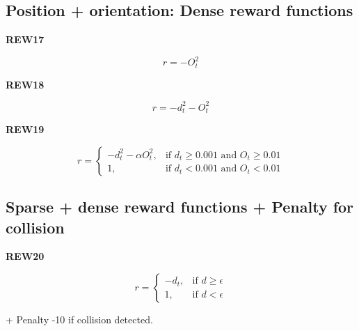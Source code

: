 \documentclass{article}
\newcommand{\norm}[1]{\left\lVert#1\right\rVert}
\begin{document}
\subsection{Position + orientation: Dense reward functions}

\textbf{REW17}

\begin{equation}
r = - O_t^2
\end{equation}

\textbf{REW18}

\begin{equation}
r = - d_t^2 - O_t^2
\end{equation}

\textbf{REW19}

\begin{equation}
r = \begin{cases}
    - d_t^2 - \alpha O_t^2 , & \text{if $d_t \geq 0.001 $ and $O_t \geq 0.01$}\\
    1 , & \text{if $d_t < 0.001 $ and $O_t < 0.01$}
  \end{cases}
\end{equation}


\subsection{Sparse + dense reward functions + Penalty for collision}

\textbf{REW20}

\begin{equation}
r = \begin{cases}
    - d_t , & \text{if $d \geq \epsilon $}\\
    1 , & \text{if $d < \epsilon $}
  \end{cases}
\end{equation}

+ Penalty -10 if collision detected.




%
%
%


%
\end{document}

